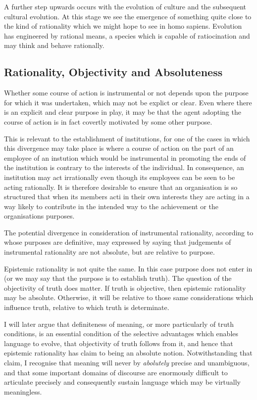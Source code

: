 \documentclass[10pt,titlepage]{book}
\begin{document}
A further step upwards occurs with the evolution of culture and the subsequent cultural evolution.
At this stage we see the emergence of something quite close to the kind of rationality which we might hope to see in homo sapiens.
Evolution has engineered by rational means, a species which is capable of ratiocination and may think and behave rationally.

\subsection{Rationality, Objectivity and Absoluteness}

Whether some course of action is instrumental or not depends upon the purpose for which it was undertaken, which may not be explict or clear.
Even where there is an explicit and clear purpose in play, it may be that the agent adopting the course of action is in fact covertly motivated by some other purpose.

This is relevant to the establishment of institutions, for one of the cases in which this divergence may take place is where a course of action on the part of an employee of an instution  which would be instrumental in promoting the ends of the institution is contrary to the interests of the individual.
In consequence, an institution may act irrationally even though its employees can be seen to be acting rationally.
It is therefore desirable to ensure that an organisation is so structured that when its members acti in their own interests they are acting in a way likely to contribute in the intended way to the achievement or the organisations purposes.

The potential divergence in consideration of instrumental rationality, according to whose purposes are definitive, may expressed by saying that judgements of instrumental rationality are not absolute, but are relative to purpose.

Epistemic rationality is not quite the same.
In this case purpose does not enter in (or we may say that the purpose is to establish truth).
The question of the objectivity of truth does matter.
If truth is objective, then epistemic rationality may be absolute.
Otherwise, it will be relative to those same considerations which influence truth, relative to which truth is determinate.

I will later argue that definiteness of meaning, or more particularly of truth conditions, is an essential condition of the selective advantages which enables language to evolve, that objectivity of truth follows from it, and hence that epistemic rationality has claim to being an absolute notion.
Notwithstanding that claim, I recognise that meaning will never by \emph{abolutely} precise and unambiguous, and that some important domains of discourse are enormously difficult to articulate precisely and consequently sustain language which may be virtually meaningless.
\end{document}
